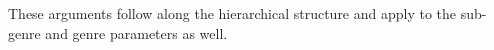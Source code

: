 These arguments follow along the hierarchical structure and apply to the sub-genre and genre parameters as well.

